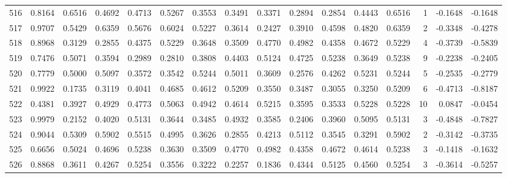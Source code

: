 \begin{tabular}{lrrrrrrrrrrrrrrr}
516 &      0.8164 &  0.6516 &  0.4692 &  0.4713 &  0.5267 &  0.3553 &  0.3491 &  0.3371 &  0.2894 &  0.2854 &   0.4443 &     0.6516 &      1 &                   -0.1648 &                    -0.1648 \\
517 &      0.9707 &  0.5429 &  0.6359 &  0.5676 &  0.6024 &  0.5227 &  0.3614 &  0.2427 &  0.3910 &  0.4598 &   0.4820 &     0.6359 &      2 &                   -0.3348 &                    -0.4278 \\
518 &      0.8968 &  0.3129 &  0.2855 &  0.4375 &  0.5229 &  0.3648 &  0.3509 &  0.4770 &  0.4982 &  0.4358 &   0.4672 &     0.5229 &      4 &                   -0.3739 &                    -0.5839 \\
519 &      0.7476 &  0.5071 &  0.3594 &  0.2989 &  0.2810 &  0.3808 &  0.4403 &  0.5124 &  0.4725 &  0.5238 &   0.3649 &     0.5238 &      9 &                   -0.2238 &                    -0.2405 \\
520 &      0.7779 &  0.5000 &  0.5097 &  0.3572 &  0.3542 &  0.5244 &  0.5011 &  0.3609 &  0.2576 &  0.4262 &   0.5231 &     0.5244 &      5 &                   -0.2535 &                    -0.2779 \\
521 &      0.9922 &  0.1735 &  0.3119 &  0.4041 &  0.4685 &  0.4612 &  0.5209 &  0.3550 &  0.3487 &  0.3055 &   0.3250 &     0.5209 &      6 &                   -0.4713 &                    -0.8187 \\
522 &      0.4381 &  0.3927 &  0.4929 &  0.4773 &  0.5063 &  0.4942 &  0.4614 &  0.5215 &  0.3595 &  0.3533 &   0.5228 &     0.5228 &     10 &                    0.0847 &                    -0.0454 \\
523 &      0.9979 &  0.2152 &  0.4020 &  0.5131 &  0.3644 &  0.3485 &  0.4932 &  0.3585 &  0.2406 &  0.3960 &   0.5095 &     0.5131 &      3 &                   -0.4848 &                    -0.7827 \\
524 &      0.9044 &  0.5309 &  0.5902 &  0.5515 &  0.4995 &  0.3626 &  0.2855 &  0.4213 &  0.5112 &  0.3545 &   0.3291 &     0.5902 &      2 &                   -0.3142 &                    -0.3735 \\
525 &      0.6656 &  0.5024 &  0.4696 &  0.5238 &  0.3630 &  0.3509 &  0.4770 &  0.4982 &  0.4358 &  0.4672 &   0.4614 &     0.5238 &      3 &                   -0.1418 &                    -0.1632 \\
526 &      0.8868 &  0.3611 &  0.4267 &  0.5254 &  0.3556 &  0.3222 &  0.2257 &  0.1836 &  0.4344 &  0.5125 &   0.4560 &     0.5254 &      3 &                   -0.3614 &                    -0.5257 \\

\end{tabular}
